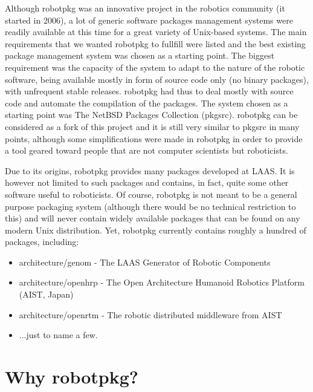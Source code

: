 Although  robotpkg was an   innovative project in  the  robotics community  (it
started in 2006),  a lot of  generic software packages  management systems were
readily available at this time for a great variety  of Unix-based systems.  The
main requirements that we wanted robotpkg to fullfill  were listed and the best
existing package management system was chosen as a starting point.  The biggest
requirement  was  the capacity of  the  system to adapt to    the nature of the
robotic software, being available mostly in form of source code only (no binary
packages), with  unfrequent stable releases.  robotpkg had thus to  deal mostly
with source   code and automate  the compilation  of the packages.   The system
chosen  as   a starting point   was  The NetBSD  Packages  Collection (pkgsrc).
robotpkg can be  considered as a   fork of this  project and  it  is still very
similar to pkgsrc  in many points, although  some simplifications were made  in
robotpkg in order to provide a tool geared  toward people that are not computer
scientists but roboticists.

Due to its  origins, robotpkg provides many  packages developed at LAAS.  It is
however not limited to  such packages and  contains, in fact, quite some  other
software useful  to roboticists.   Of  course, robotpkg is  not  meant to be  a
general  purpose  packaging  system  (although there   would  be   no technical
restriction to this) and will never contain  widely available packages that can
be  found on any modern  Unix  distribution. Yet,  robotpkg currently  contains
roughly a hundred of packages, including:

\begin{itemize}
   \item architecture/genom - The LAAS Generator of Robotic Components

   \item architecture/openhrp - The Open Architecture Humanoid Robotics
   Platform (AIST, Japan)

   \item architecture/openrtm - The robotic distributed middleware from AIST

   \item ...just to name a few.
\end{itemize}


\section{Why robotpkg?} %

